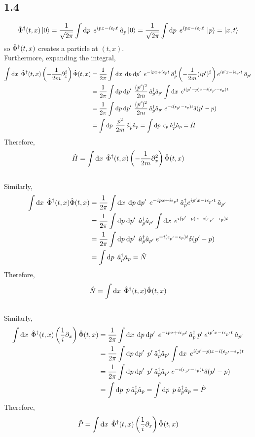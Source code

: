\documentclass[12pt]{extarticle}
\begin{document}
\subsection*{1.4}
\begin{align*}
\hat{\Phi}^\dagger(t, x) \left| 0 \right> = \frac{1}{\sqrt{2 \pi}} \int \mathrm{d}p \: \: e^{i p x - i\epsilon_p t} \: \hat{a}_p \left| 0 \right> =  \frac{1}{\sqrt{2 \pi}} \int \mathrm{d}p \: \: e^{i p x - i\epsilon_p t} \: \left| p \right> = \left| x, t \right>
\end{align*}
so $\hat{\Phi}^\dagger(t, x)$ creates a particle at $(t, x)$. \bigskip\\
Furthermore, expanding the integral,
\begin{align*}
\int \mathrm{d}x \: \: \hat{\Phi}^\dagger(t, x) \left( - \frac{1}{2m} \partial_x^2\right) \hat{\Phi}(t, x) & = \frac{1}{2\pi} \int \mathrm{d}x \: \: \mathrm{d}p \: \mathrm{d}p' \: \: e^{- i p x + i \epsilon_p t} \: \hat{a}^\dagger_p \left(- \frac{1}{2 m} ( i p')^2 \right) e^{i p' x - i \epsilon_{p'} t} \: \hat{a}_{p'} 
\\
& = \frac{1}{2\pi} \int \mathrm{d}p \: \mathrm{d}p' \: \: \frac{(p')^2}{2m} \: \hat{a}^\dagger_p \hat{a}_{p'}  \int \mathrm{d}x \: \: e^{i (p' - p) x - i (\epsilon_{p'} - \epsilon_{p}) t}
\\
& = \frac{1}{2\pi} \int \mathrm{d}p \: \mathrm{d}p' \: \: \frac{(p')^2}{2m}  \: \hat{a}^\dagger_p \hat{a}_{p'} \: e^{- i (\epsilon_{p'} - \epsilon_{p}) t} \delta(p' - p)
\\
& = \int \mathrm{d}p \: \: \frac{p^2}{2m}  \: \hat{a}^\dagger_p \hat{a}_{p} = \int \mathrm{d}p \: \: \epsilon_p \: \hat{a}^\dagger_p \hat{a}_{p} = \hat{H}
\end{align*}
Therefore,
\[\hat{H} = \int \mathrm{d}x \: \: \hat{\Phi}^\dagger(t, x) \left( - \frac{1}{2m} \partial_x^2\right) \hat{\Phi}(t, x)\]
\bigskip\\
Similarly,
\begin{align*}
\int \mathrm{d}x \: \: \hat{\Phi}^\dagger(t, x) \hat{\Phi}(t, x) & = \frac{1}{2\pi} \int \mathrm{d}x \: \: \mathrm{d}p \: \mathrm{d}p' \: \: e^{- i p x + i \epsilon_p t} \: \hat{a}^\dagger_p  e^{i p' x - i \epsilon_{p'} t} \: \hat{a}_{p'} 
\\
& = \frac{1}{2\pi} \int \mathrm{d}p \: \mathrm{d}p' \: \: \hat{a}^\dagger_p \hat{a}_{p'}  \int \mathrm{d}x \: \: e^{i (p' - p) x - i (\epsilon_{p'} - \epsilon_{p}) t}
\\
& = \frac{1}{2\pi} \int \mathrm{d}p \: \mathrm{d}p' \: \: \hat{a}^\dagger_p \hat{a}_{p'} \: e^{- i (\epsilon_{p'} - \epsilon_{p}) t} \delta(p' - p)
\\
& = \int \mathrm{d}p \: \: \hat{a}^\dagger_p \hat{a}_{p} = \hat{N}
\end{align*}
Therefore,
\[ \hat{N} = \int \mathrm{d}x \: \: \hat{\Phi}^\dagger(t, x) \hat{\Phi}(t, x)\]
\bigskip\\
Similarly,
\begin{align*}
\int \mathrm{d}x \: \: \hat{\Phi}^\dagger(t, x) \left( \frac{1}{i} \partial_x\right) \hat{\Phi}(t, x) & = \frac{1}{2\pi} \int \mathrm{d}x \: \: \mathrm{d}p \: \mathrm{d}p' \: \: e^{- i p x + i \epsilon_p t} \: \hat{a}^\dagger_p \: p' \: e^{i p' x - i \epsilon_{p'} t} \: \hat{a}_{p'} 
\\
& = \frac{1}{2\pi} \int \mathrm{d}p \: \mathrm{d}p' \: \: p' \: \hat{a}^\dagger_p \hat{a}_{p'}  \int \mathrm{d}x \: \: e^{i (p' - p) x - i (\epsilon_{p'} - \epsilon_{p}) t}
\\
& = \frac{1}{2\pi} \int \mathrm{d}p \: \mathrm{d}p' \: \: p'  \: \hat{a}^\dagger_p \hat{a}_{p'} \: e^{- i (\epsilon_{p'} - \epsilon_{p}) t} \delta(p' - p)
\\
& = \int \mathrm{d}p \: \: p \: \hat{a}^\dagger_p \hat{a}_{p} = \int \mathrm{d}p \: \: p \: \hat{a}^\dagger_p \hat{a}_{p} = \hat{P}
\end{align*}
Therefore,
\[\hat{P} = \int \mathrm{d}x \: \: \hat{\Phi}^\dagger(t, x) \left( \frac{1}{i} \partial_x\right) \hat{\Phi}(t, x)\]
\end{document}
